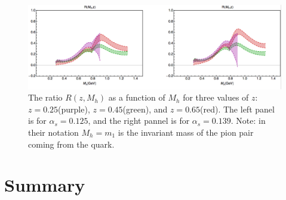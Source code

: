 \documentclass[abstract = on,listof=totoc, bibliography=totoc]{scrreprt}
\begin{document}
 \begin{figure}
\begin{center}
\includegraphics[width = .8\textwidth]{extractionIFF2}
\caption[Extraction of IFF from Belle data]{The ratio $R(z,M_h)$ as a function of $M_h$ for three values of $z$: $z = 0.25$(purple), $z=0.45$(green), and $z=0.65$(red). The left panel is for $\alpha_s = 0.125$, and the right pannel is for $\alpha_s = 0.139$\cite{RealEstValTrans}. Note: in their notation $M_h = m_1$ is the invariant mass of the pion pair coming from the quark.}
\label{fig:extractionIFF}
\end{center}
\end{figure}




\section{Summary}
\end{document}
